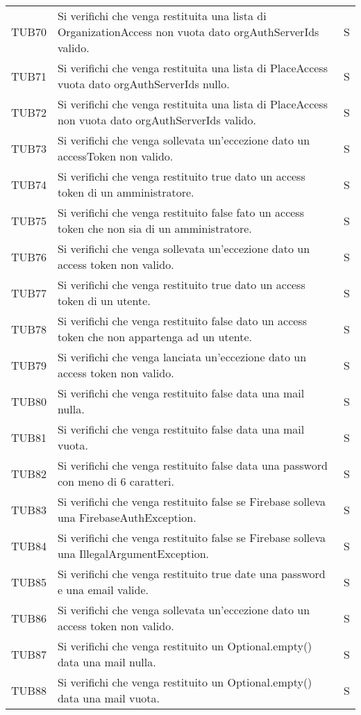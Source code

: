 {\begin{longtable}{ c C{13cm} C{1cm}}
TUB70 & Si verifichi che venga restituita una lista di OrganizationAccess non vuota dato orgAuthServerIds valido. & S \\
TUB71 & Si verifichi che venga restituita una lista di PlaceAccess vuota dato orgAuthServerIds nullo. & S \\
TUB72 & Si verifichi che venga restituita una lista di PlaceAccess non vuota dato orgAuthServerIds valido. & S \\
TUB73 & Si verifichi che venga sollevata un'eccezione dato un accessToken non valido. & S \\
TUB74 & Si verifichi che venga restituito true dato un access token di un amministratore. & S \\
TUB75 & Si verifichi che venga restituito false fato un access token che non sia di un amministratore. & S \\
TUB76 & Si verifichi che venga sollevata un'eccezione dato un access token non valido. & S \\
TUB77 & Si verifichi che venga restituito true dato un access token di un utente. & S \\
TUB78 & Si verifichi che venga restituito false dato un access token che non appartenga ad un utente. & S \\
TUB79 & Si verifichi che venga lanciata un'eccezione dato un access token non valido. & S \\
TUB80 & Si verifichi che venga restituito false data una mail nulla. & S \\
TUB81 & Si verifichi che venga restituito false data una mail vuota. & S \\
TUB82 & Si verifichi che venga restituito false data una password con meno di 6 caratteri. & S \\
TUB83 & Si verifichi che venga restituito false se Firebase solleva una FirebaseAuthException. & S \\
TUB84 & Si verifichi che venga restituito false se Firebase solleva una IllegalArgumentException. & S \\
TUB85 & Si verifichi che venga restituito true date una password e una email valide. & S \\
TUB86 & Si verifichi che venga sollevata un'eccezione dato un access token non valido. & S \\
TUB87 & Si verifichi che venga restituito un Optional.empty() data una mail nulla. & S \\
TUB88 & Si verifichi che venga restituito un Optional.empty() data una mail vuota. & S \\

\end{longtable}}
